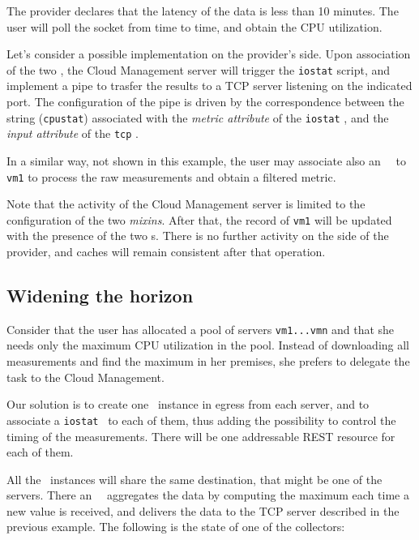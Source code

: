 \documentclass[10pt]{article}  %
\begin{document}
The provider declares that the latency of the data is less than 10 minutes. The user will poll the socket from time to time, and obtain the CPU utilization.

Let's consider a possible implementation on the provider's side. Upon association of the two \mi , the Cloud Management server will trigger the {\tt \small iostat} script, and implement a pipe to trasfer the results to a TCP server listening on the indicated port. The configuration of the pipe is driven by the correspondence between the string ({\tt cpustat}) associated with the {\em metric attribute} of the {\tt \small iostat} \mi , and the {\em input attribute} of the {\tt \small tcp} \mi .

In a similar way, not shown in this example, the user may associate also an \aggr\ \mi\ to {\tt \small vm1} to process the raw measurements and obtain a filtered metric.

Note that the activity of the Cloud Management server is limited to the configuration of the two {\em mixins}. After that, the record of {\tt \small vm1} will be updated with the presence of the two \mi s. There is no further activity on the side of the provider, and caches will remain consistent after that operation.

\subsection*{Widening the horizon}

Consider that the user has allocated a pool of servers {\tt \small vm1...vmn} and that she needs only the maximum CPU utilization in the pool. Instead of downloading all measurements and find the maximum in her premises, she prefers to delegate the task to the Cloud Management.

Our solution is to create one \coll\ instance in egress from each server, and to associate a {\tt \small iostat} \mi\ to each of them, thus adding the possibility to control the timing of the measurements. There will be one addressable REST resource for each of them.

All the \coll\ instances will share the same destination, that might be one of the servers. There an \aggr\ \mi\ aggregates the data by computing the maximum each time a new value is received, and delivers the data to the TCP server described in the previous example. The following is the state of one of the collectors:
\end{document}
